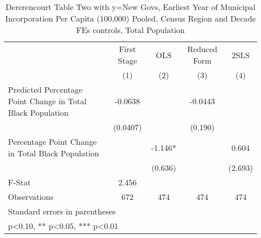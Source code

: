 \begin{table}[htbp]\centering
\def\sym#1{\ifmmode^{#1}\else\(^{#1}\)\fi}
\caption{Dererencourt Table Two with y=New Govs, Earliest Year of Municipal Incorporation Per Capita (100,000) Pooled, Census Region and Decade FEs controls, Total Population}
\begin{tabular}{l*{4}{c}}
\toprule
                    & First Stage   &         OLS   &Reduced Form   &        2SLS   \\
                    &\multicolumn{1}{c}{(1)}   &\multicolumn{1}{c}{(2)}   &\multicolumn{1}{c}{(3)}   &\multicolumn{1}{c}{(4)}   \\
\midrule
Predicted Percentage Point Change in Total Black Population&     -0.0638   &               &     -0.0443   &               \\
                    &    (0.0407)   &               &     (0.190)   &               \\
\addlinespace
Percentage Point Change in Total Black Population&               &      -1.146*  &               &       0.604   \\
                    &               &     (0.636)   &               &     (2.693)   \\
\midrule
F-Stat              &       2.456   &               &               &               \\
Observations        &         672   &         474   &         474   &         474   \\
\bottomrule
\multicolumn{5}{l}{\footnotesize Standard errors in parentheses}\\
\multicolumn{5}{l}{\footnotesize * p<0.10, ** p<0.05, *** p<0.01}\\
\end{tabular}
\end{table}

